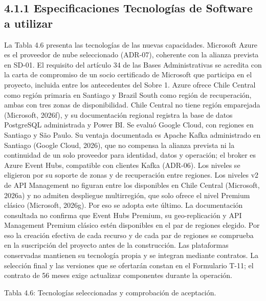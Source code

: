 \documentclass[11pt]{article}
\begin{document}
\subsection{4.1.1 Especificaciones Tecnologías de Software a utilizar}

La Tabla 4.6 presenta las tecnologías de las nuevas capacidades. Microsoft Azure es el proveedor de nube seleccionado (ADR-07), coherente con la alianza prevista en SD-01. El requisito del artículo 34 de las Bases Administrativas se acredita con la carta de compromiso de un socio certificado de Microsoft que participa en el proyecto, incluida entre los antecedentes del Sobre 1. Azure ofrece Chile Central como región primaria en Santiago y Brazil South como región de recuperación, ambas con tres zonas de disponibilidad. Chile Central no tiene región emparejada (Microsoft, 2026f), y su documentación regional registra la base de datos PostgreSQL administrada y Power BI. Se evaluó Google Cloud, con regiones en Santiago y São Paulo. Su ventaja documentada es Apache Kafka administrado en Santiago (Google Cloud, 2026), que no compensa la alianza prevista ni la continuidad de un solo proveedor para identidad, datos y operación; el broker es Azure Event Hubs, compatible con clientes Kafka (ADR-06). Los niveles se eligieron por su soporte de zonas y de recuperación entre regiones. Los niveles v2 de API Management no figuran entre los disponibles en Chile Central (Microsoft, 2026a) y no admiten despliegue multirregión, que solo ofrece el nivel Premium clásico (Microsoft, 2026g). Por eso se adopta este último. La documentación consultada no confirma que Event Hubs Premium, su geo-replicación y API Management Premium clásico estén disponibles en el par de regiones elegido. Por eso la creación efectiva de cada recurso y de cada par de regiones se comprueba en la suscripción del proyecto antes de la construcción. Las plataformas conservadas mantienen su tecnología propia y se integran mediante contratos. La selección final y las versiones que se ofertarán constan en el Formulario T-11; el contrato de 56 meses exige actualizar componentes durante la operación.

Tabla 4.6: Tecnologías seleccionadas y comprobación de aceptación.
\end{document}
